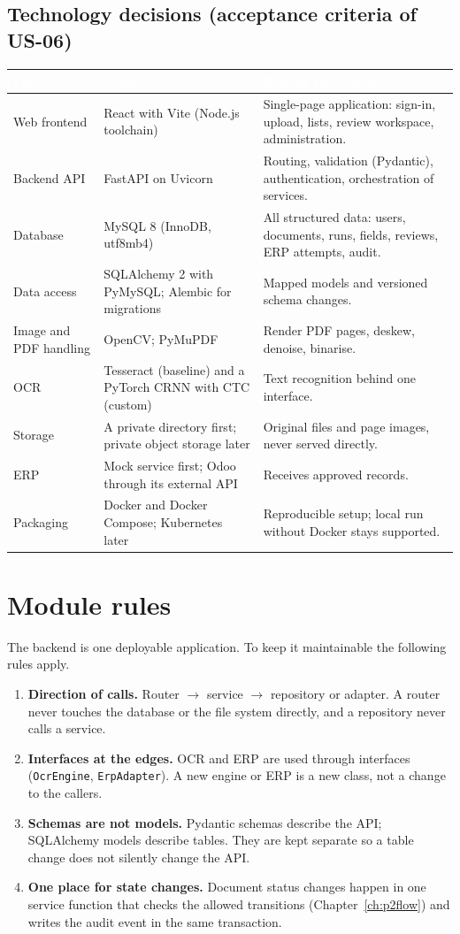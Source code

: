 \documentclass[11pt,a4paper]{report}
\newcommand{\hdr}[1]{\textcolor{white}{\sffamily\bfseries #1}}
\newcommand{\tblstart}{\rowcolors{2}{white}{rowgray}\arrayrulecolor{teal!60}}
\newcommand{\hdrrow}{\rowcolor{navy}}
\begin{document}
\subsection{Technology decisions (acceptance criteria of US-06)}
{\tblstart\small
\begin{longtable}{L{3.0cm}L{4.1cm}L{6.7cm}}
\hdrrow \hdr{Layer} & \hdr{Choice} & \hdr{Role in the system}\\ \endhead
Web frontend & React with Vite (Node.js toolchain) & Single-page application: sign-in, upload, lists, review workspace, administration.\\
Backend API & FastAPI on Uvicorn & Routing, validation (Pydantic), authentication, orchestration of services.\\
Database & MySQL 8 (InnoDB, utf8mb4) & All structured data: users, documents, runs, fields, reviews, ERP attempts, audit.\\
Data access & SQLAlchemy 2 with PyMySQL; Alembic for migrations & Mapped models and versioned schema changes.\\
Image and PDF handling & OpenCV; PyMuPDF & Render PDF pages, deskew, denoise, binarise.\\
OCR & Tesseract (baseline) and a PyTorch CRNN with CTC (custom) & Text recognition behind one interface.\\
Storage & A private directory first; private object storage later & Original files and page images, never served directly.\\
ERP & Mock service first; Odoo through its external API & Receives approved records.\\
Packaging & Docker and Docker Compose; Kubernetes later & Reproducible setup; local run without Docker stays supported.\\
\hline
\end{longtable}}

\section{Module rules}
The backend is one deployable application. To keep it maintainable the following rules apply.
\begin{enumerate}
\item \textbf{Direction of calls.} Router $\rightarrow$ service $\rightarrow$ repository or adapter. A router never touches the database or the file system directly, and a repository never calls a service.
\item \textbf{Interfaces at the edges.} OCR and ERP are used through interfaces (\texttt{OcrEngine}, \texttt{ErpAdapter}). A new engine or ERP is a new class, not a change to the callers.
\item \textbf{Schemas are not models.} Pydantic schemas describe the API; SQLAlchemy models describe tables. They are kept separate so a table change does not silently change the API.
\item \textbf{One place for state changes.} Document status changes happen in one service function that checks the allowed transitions (Chapter~\ref{ch:p2flow}) and writes the audit event in the same transaction.
\end{enumerate}
\end{document}
